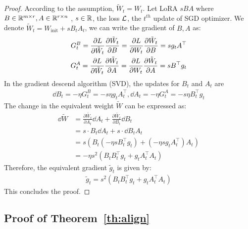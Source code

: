 \begin{proof}
According to the assumption, $\tilde W_{t} = W_{t}$.
Let LoRA $sBA$ where $B \in {\mathbb{R}}^{m \times r}, A \in {\mathbb{R}}^{r \times n}$ , $s \in {\mathbb{R}}$, the loss ${\mathcal{L}}$, the $t^{th}$ update of SGD optimizer.
We denote  $\tilde W_t = W_{\text{init}} + sB_tA_t$, we can write the gradient of $B,A$ as:
\begin{align}
G^B_t = \frac{\partial L}{\partial \tilde W_t} \frac{\partial \tilde W_t}{\partial B} = \frac{\partial L}{\partial  W_t} \frac{\partial \tilde W_t}{\partial B} = s{g_{t}}A^\top \\
G^A_t = \frac{\partial L}{\partial \tilde W_t} \frac{\partial \tilde W_t}{\partial A} = \frac{\partial L}{\partial W_t} \frac{\partial \tilde W_t}{\partial A} = sB^\top {g_{t}}
\end{align}
In the gradient descend algorithm (SVD), the updates for \( B_t \) and \( A_t \) are
\begin{align}
\dd B_t = - \eta G^B_t = -s \eta g_{t} A_t^\top, \dd A_t = -\eta G^A_t = -s \eta B_t^\top g_{t}
\end{align}
The change in the equivalent weight \( \tilde{W} \) can be expressed as:
\begin{align}
\dd \tilde{W} &= \frac{\partial \tilde{W_t}}{\partial A_t} \dd A_t + \frac{\partial \tilde{W_t}}{\partial B_t} \dd B_t \\
&= s \cdot B_t \dd A_t + s \cdot \dd B_t A_t \\
&= s \left( B_t (-\eta s B_t^\top g_{t}) + (-\eta s g_{t} A_t^\top) A_t \right) \\
&= -\eta s^2 \left( B_t B_t^\top g_{t} + g_{t} A_t^\top A_t \right)
\end{align}
Therefore, the equivalent gradient \( \tilde{g}_t \) is given by:
\begin{align}
\tilde{g}_t = s^2 \left( B_t B_t^\top g_{t} + g_{t} A_t^\top A_t \right)
\end{align}
This concludes the proof.
\end{proof}

\subsection{Proof of Theorem~\ref{th:align}}

